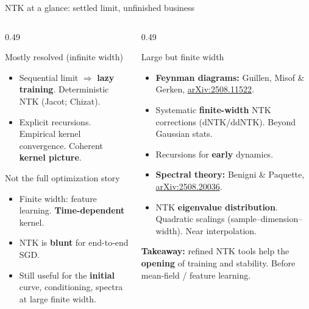 \documentclass[aspectratio=169]{beamer}
\begin{document}
\begin{frame}[t]{NTK at a glance: settled limit, unfinished business}
  \footnotesize
  \begin{columns}[T,onlytextwidth]
    \begin{column}{0.49\textwidth}
      \begin{block}{Mostly resolved (infinite width)}
        \begin{itemize}\setlength{\itemsep}{0.12em}
          \item Sequential limit $\Rightarrow$ \textbf{lazy training}. Deterministic NTK (Jacot; Chizat).
          \item Explicit recursions. Empirical kernel convergence. Coherent \textbf{kernel picture}.
        \end{itemize}
      \end{block}
      \begin{exampleblock}{Not the full optimization story}
        \begin{itemize}\setlength{\itemsep}{0.12em}
          \item Finite width: feature learning. \textbf{Time-dependent} kernel.
          \item NTK is \textbf{blunt} for end-to-end SGD.
          \item Still useful for the \textbf{initial} curve, conditioning, spectra at large finite width.
        \end{itemize}
      \end{exampleblock}
    \end{column}
    \begin{column}{0.49\textwidth}
      \begin{alertblock}{Large but finite width}
        \scriptsize
        \begin{itemize}\setlength{\itemsep}{0.15em}
          \item \textbf{Feynman diagrams:} Guillen, Misof \& Gerken, \href{https://arxiv.org/abs/2508.11522}{arXiv:2508.11522}.
          \item Systematic \textbf{finite-width} NTK corrections (dNTK/ddNTK). Beyond Gaussian stats.
          \item Recursions for \textbf{early} dynamics.
          \item \textbf{Spectral theory:} Benigni \& Paquette, \href{https://arxiv.org/abs/2508.20036}{arXiv:2508.20036}.
          \item NTK \textbf{eigenvalue distribution}. Quadratic scalings (sample--dimension--width). Near interpolation.
        \end{itemize}
      \end{alertblock}
      \vspace{0.15em}
      \begin{block}{}
        \scriptsize
        \textbf{Takeaway:} refined NTK tools help the \textbf{opening} of training and stability. Before mean-field / feature learning.
      \end{block}
    \end{column}
  \end{columns}
\end{frame}
\end{document}
